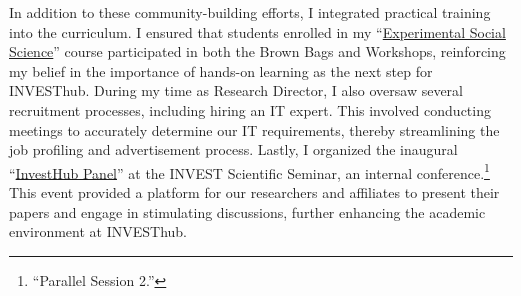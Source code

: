 \documentclass[10pt,stdletter,dateno,sigleft]{newlfm} %
\begin{document}
\begin{newlfm}
In addition to these community-building efforts, I integrated practical training into the curriculum. I ensured that students enrolled in my ``\href{https://github.com/hbahamonde/Exp_Soc_Science/raw/main/Bahamonde_Exp_Soc_Sci.pdf}{Experimental Social Science}'' course participated in both the Brown Bags and Workshops, reinforcing my belief in the importance of hands-on learning as the next step for INVESThub. During my time as Research Director, I also oversaw several recruitment processes, including hiring an IT expert. This involved conducting meetings to accurately determine our IT requirements, thereby streamlining the job profiling and advertisement process. Lastly, I organized the inaugural ``\href{https://invest.utu.fi/wp-content/uploads/2022/10/Scientific-Seminar-VII-Programme.pdf}{InvestHub Panel}'' at the INVEST Scientific Seminar, an internal conference.\footnote{``Parallel Session 2.''} This event provided a platform for our researchers and affiliates to present their papers and engage in stimulating discussions, further enhancing the academic environment at INVESThub.


\end{newlfm}
\end{document}
